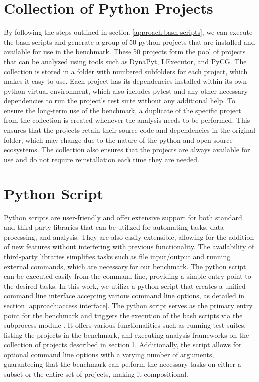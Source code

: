 \section{Collection of Python Projects}
\label{approach:collection of projects}
By following the steps outlined in section \ref{approach:bash scripts}, we can execute the bash scripts and generate a group of 50 python projects that are installed and available for use in the benchmark. These 50 projects form the pool of projects that can be analyzed using tools such as DynaPyt, LExecutor, and PyCG. The collection is stored in a folder with numbered subfolders for each project, which makes it easy to use. Each project has its dependencies installed within its own python virtual environment, which also includes pytest and any other necessary dependencies to run the project's test suite without any additional help. To ensure the long-term use of the benchmark, a duplicate of the specific project from the collection is created whenever the analysis needs to be performed. This ensures that the projects retain their source code and dependencies in the original folder, which may change due to the nature of the python and open-source ecosystems. The collection also ensures that the projects are always available for use and do not require reinstallation each time they are needed.   

\section{Python Script}
\label{approach:python script}
Python scripts are user-friendly and offer extensive support for both standard and third-party libraries that can be utilized for automating tasks, data processing, and analysis. They are also easily extensible, allowing for the addition of new features without interfering with previous functionality. The availability of third-party libraries simplifies tasks such as file input/output and running external commands, which are necessary for our benchmark. The python script can be executed easily from the command line, providing a simple entry point to the desired tasks. In this work, we utilize a python script that creates a unified command line interface accepting various command line options, as detailed in section \ref{approach:access interface}. The python script serves as the primary entry point for the benchmark and triggers the execution of the bash scripts via the subprocess module \cite{python_subprocess}. It offers various functionalities such as running test suites, listing the projects in the benchmark, and executing analysis frameworks on the collection of projects described in section \ref{approach:collection of projects}. Additionally, the script allows for optional command line options with a varying number of arguments, guaranteeing that the benchmark can perform the necessary tasks on either a subset or the entire set of projects, making it compositional.%

